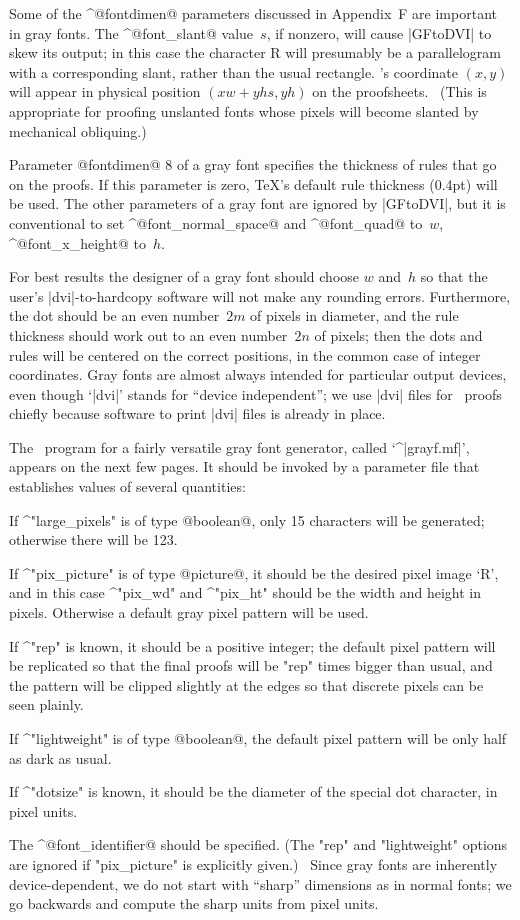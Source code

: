 Some of the ^@fontdimen@ parameters discussed in Appendix~F are important
in gray fonts. The ^@font\_slant@ value~$s$, if nonzero, will cause
|GFtoDVI| to skew its output; in this case the character {\manual R} will
presumably be a parallelogram with a corresponding slant, rather than the
usual rectangle. \MF's coordinate $(x,y)$ will appear in physical position
$(xw+yhs,yh)$ on the proofsheets. \ (This is appropriate for proofing unslanted
fonts whose pixels will become slanted by mechanical obliquing.)

Parameter @fontdimen@ 8 of a gray font specifies the thickness of rules
that go on the proofs. If this parameter is zero, \TeX's default
rule thickness (0.4\thinspace pt) will be used.
The other parameters of a gray font are ignored by |GFtoDVI|\null, but
it is conventional to set ^@font\_normal\_space@ and ^@font\_quad@ to~$w$,
^@font\_x\_height@ to~$h$.

For best results the designer of a gray font should choose $w$ and~$h$
so that the user's |dvi|-to-hardcopy software will not make any
rounding errors. Furthermore, the dot should be an even number~$2m$ of
pixels in diameter, and the rule thickness should work out to an
even number~$2n$ of pixels; then the dots and rules will be centered on
the correct positions, in the common case of integer coordinates. Gray fonts
are almost always intended for particular output devices, even though
`|dvi|' stands for ``device independent''; we use |dvi| files for \MF\
proofs chiefly because software to print |dvi| files is already in place.

The \MF\ program for a fairly versatile gray font generator, called
`^|grayf.mf|', appears on the next few pages. It should be invoked by a
parameter file that establishes values of several quantities:
\smallskip
\item\bull If ^"large\_pixels" is of type @boolean@, only 15 characters
will be generated; otherwise there will be 123.
\item\bull If ^"pix\_picture" is of type @picture@, it should be the
desired pixel image `{\manual R}', and in this case ^"pix\_wd" and
^"pix\_ht" should be the width and height in pixels. Otherwise a default
gray pixel pattern will be used.
\item\bull If ^"rep" is known, it should be a positive integer; the default
pixel pattern will be replicated so that the final
proofs will be "rep" times bigger than usual, and the pattern will be clipped
slightly at the edges so that discrete pixels can be seen plainly.
\item\bull If ^"lightweight" is of type @boolean@, the default pixel
pattern will be only half as dark as usual.
\item\bull If ^"dotsize" is known, it should be the diameter of the
special dot character, in pixel units.
\item\bull The ^@font\_identifier@ should be specified.
\smallskip\noindent
(The "rep" and "lightweight" options are ignored if "pix\_picture" is
explicitly given.) \
Since gray fonts are inherently device-dependent, we do not start
with ``sharp'' dimensions as in normal fonts; we go backwards and
compute the sharp units from pixel units.

